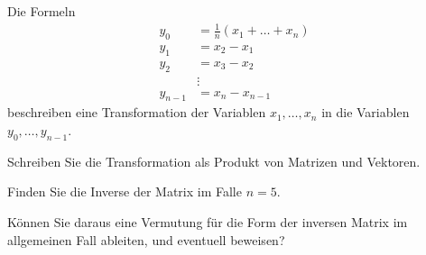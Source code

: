 Die Formeln \begin{align*}
y_0&=\frac1n(x_1+\dots + x_n)\\
y_1&=x_2-x_1\\
y_2&=x_3-x_2\\
&\vdots\\
y_{n-1}&=x_n-x_{n-1}
\end{align*}
beschreiben eine Transformation der Variablen $x_1,\dots,x_n$
in die Variablen $y_0,\dots,y_{n-1}$.
\begin{teilaufgaben}
\item Schreiben Sie die Transformation als Produkt von Matrizen und Vektoren.
\item Finden Sie die Inverse der Matrix im Falle $n=5$.
\item Können Sie daraus eine Vermutung für die Form der inversen Matrix im allgemeinen Fall
ableiten, und eventuell beweisen?
\end{teilaufgaben}

